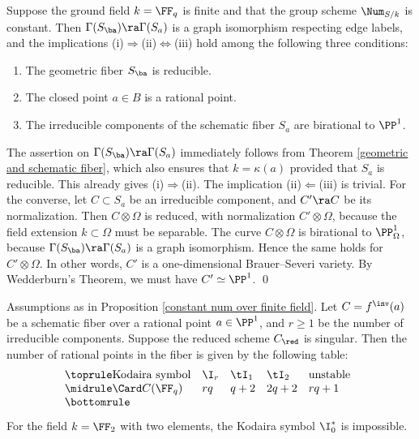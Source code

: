 \begin{proposition}
\notready
\label{constant num over finite field}
Suppose the ground field $k=\FF_q$ is finite and
that  the  group scheme $\Num_{S/k}$ is constant.
Then $\Gamma(S_\ba)\ra\Gamma(S_a)$ is a graph isomorphism respecting edge labels, and
the implications (i)$\Rightarrow$(ii)$\Leftrightarrow$(iii) hold  among the following three conditions:
\begin{enumerate}
\item The geometric fiber $S_\ba$ is reducible.
\item The closed point $a\in B$ is a rational point.
\item The irreducible components of the schematic fiber $S_a$ are birational to $\PP^1$.
\end{enumerate}
\end{proposition}

\proof
The   assertion on $\Gamma(S_\ba)\ra\Gamma(S_a)$ immediately follows from Theorem \ref{geometric and schematic fiber},
which also ensures that   $k=\kappa(a)$ provided that $S_a$ is reducible.
This already gives (i)$\Rightarrow$(ii). The implication (ii)$\Leftarrow$(iii) is trivial.
For the converse,  let $C\subset S_a$ be an irreducible component, and $C'\ra C$ be its normalization.
Then $C\otimes\Omega$ is reduced, with normalization $C'\otimes\Omega$, because the field extension $k\subset\Omega$
must be separable. The curve $C\otimes\Omega$ is  birational to $\PP^1_\Omega$, because
$\Gamma(S_\ba)\ra\Gamma(S_a)$ is a graph isomorphism. Hence the same holds for $C'\otimes\Omega$.
In other words, $C'$ is a one-dimensional Brauer--Severi variety.
By Wedderburn's Theorem, we must have $C'\simeq \PP^1$.
\qed

\begin{proposition}
\notready
\label{canonical type rational points}
Assumptions as in Proposition \ref{constant num over finite field}.
Let $C=f^\inv(a)$ be a sche\-matic  fiber over a rational point $a\in\PP^1$, and $r\geq 1$ be the number
of irreducible components. Suppose the reduced scheme $C_\red$ is singular. Then the number  of rational points in the fiber
is  given by the following table:
$$
\begin{array}[b]{@{}lllll}
\toprule
\text{\rm Kodaira symbol}	& \I_r	& \tI_1	&\tI_2	& \text{\rm unstable}\\
\midrule
\Card C(\FF_q)				& rq	& q+2 	& 2q+2	& rq+1 \\
\bottomrule
\end{array}
$$
For the field $k=\FF_2$ with two elements, the  Kodaira symbol $\I_0^*$ is impossible.
\end{proposition}

